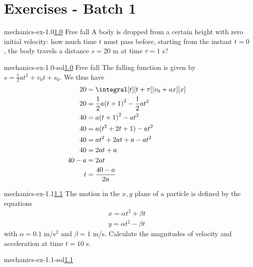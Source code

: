 \documentclass[preview]{standalone}
\begin{document}
\genpage

\section{Exercises - Batch 1}

\begin{snippetexercise}{mechanics-ex-1.0}{\underline{1.0} Free fall}
    A body is dropped from a certain height with zero initial velocity: how much time \(t\) must pass before,
    starting from the instant \(t=0\), the body travels a distance \(s=20\) m at time \(\tau=1\) s?
\end{snippetexercise}

\begin{snippetsolution}{mechanics-ex-1.0-sol}{\underline{1.0} Free fall}
    The falling function is given by \(s = \frac{1}{2}at^2 + v_0t + s_0\).
    We thus have
    \begin{align*}
        20 &= \integral[t][t+\tau][v_0 + ax][x] \\
        20 &= \frac{1}{2}a{(t+1)}^2 - \frac{1}{2}at^2 \\
        40 &= a{(t+1)}^2 - at^2 \\
        40 &= a(t^2 + 2t + 1) - at^2 \\
        40 &= at^2 + 2at + a - at^2 \\
        40 &= 2at + a \\
        40 - a &= 2at \\
        t &= \frac{40 - a}{2a}
    \end{align*}
\end{snippetsolution}

\begin{snippetexercise}{mechanics-ex-1.1}{\underline{1.1}}
    The motion in the \(x, y\) plane of a particle is defined by the equations
    \begin{align*}
        x = \alpha t^2 + \beta t \\
        y = \alpha t^2 - \beta t
    \end{align*}
    with \(\alpha = 0.1\) m/s\(^2\) and \(\beta = 1\) m/s.
    Calculate the magnitudes of velocity and acceleration at time \(t = 10\) s.
\end{snippetexercise}

\begin{snippetsolution}{mechanics-ex-1.1-sol}{\underline{1.1}}
    \todo
\end{snippetsolution}
\end{document}
